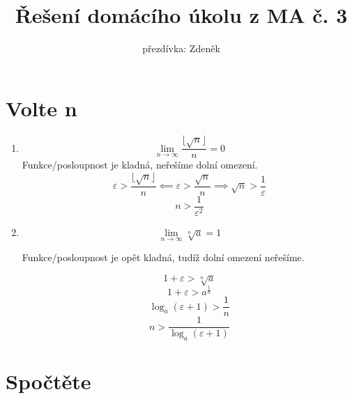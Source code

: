 \documentclass[10pt,a4paper]{article}
\title{Řešení domácího úkolu z MA č. 3}
\author{přezdívka: Zdeněk}
\date{}
\theoremstyle{plain}
\theoremstyle{definition}
\begin{document}
\maketitle

\section{Volte n}

\begin{enumerate}[label=(\alph*)]
\item \[ \lim_{n \to \infty} \frac{ \lfloor \sqrt{n} \rfloor }{n} = 0
 \]
 Funkce/posloupnost je kladná, neřešíme dolní omezení.
\[ \varepsilon > \frac{ \lfloor \sqrt{n} \rfloor }{n}   \impliedby 
\varepsilon > \frac{\sqrt{n}}{n} \implies \sqrt{n} > \frac1\varepsilon \]
\[ n > \frac1{\varepsilon^2} \]

\item \[ \lim_{n \to \infty} \sqrt[n]{a} = 1 \]

Funkce/posloupnost je opět kladná, tudíž dolní omezení neřešíme.

\[ 1 + \varepsilon > \sqrt[n]{a}  \]
\[ 1 + \varepsilon > a^{\frac1n} \]
\[ \log_a{(\varepsilon + 1)} > \frac1n \]
\[ n > \frac1{ \log_a{(\varepsilon + 1)}} \]

\end{enumerate}

\section{Spočtěte}
\end{document}
